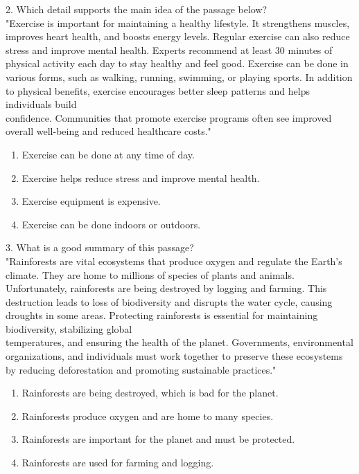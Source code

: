 \documentclass[12pt]{article}
\begin{document}
2. Which detail supports the main idea of the passage below?\\
"Exercise is important for maintaining a healthy lifestyle. It strengthens muscles, improves heart health, and boosts energy levels. Regular exercise can also reduce stress and improve mental health. Experts recommend at least 30 minutes of physical activity each day to stay healthy and feel good. Exercise can be done in various forms, such as walking, running, swimming, or playing sports. In addition to physical benefits, exercise encourages better sleep patterns and helps individuals build \\confidence. Communities that promote exercise programs often see improved overall well-being and reduced healthcare costs."\\
\begin{enumerate}[label=\Alph*.]
    \item Exercise can be done at any time of day.  
    \item Exercise helps reduce stress and improve mental health.  
    \item Exercise equipment is expensive.  
    \item Exercise can be done indoors or outdoors.  
\end{enumerate}

\vspace{1cm}

3. What is a good summary of this passage?\\
"Rainforests are vital ecosystems that produce oxygen and regulate the Earth’s \\climate. They are home to millions of species of plants and animals. Unfortunately, rainforests are being destroyed by logging and farming. This destruction leads to loss of biodiversity and disrupts the water cycle, causing droughts in some areas. Protecting rainforests is essential for maintaining biodiversity, stabilizing global \\temperatures, and ensuring the health of the planet. Governments, environmental organizations, and individuals must work together to preserve these ecosystems by reducing deforestation and promoting sustainable practices."\\
\begin{enumerate}[label=\Alph*.]
    \item Rainforests are being destroyed, which is bad for the planet.  
    \item Rainforests produce oxygen and are home to many species.  
    \item Rainforests are important for the planet and must be protected.  
    \item Rainforests are used for farming and logging.  
\end{enumerate}
\end{document}
